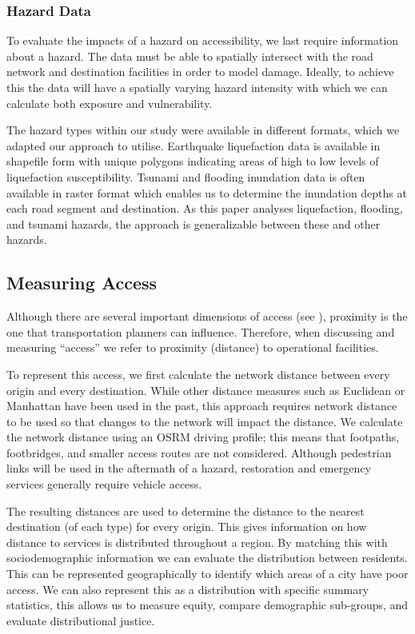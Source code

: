 \documentclass[review,3p,times,onecolumn,sort&compress,12pt]{elsarticle}
\begin{document}
\subsubsection{Hazard Data}
To evaluate the impacts of a hazard on accessibility, we last require information about a hazard. 
The data must be able to spatially intersect with the road network and destination facilities in order to model damage.
Ideally, to achieve this the data will have a spatially varying hazard intensity with which we can calculate both exposure and vulnerability.

The hazard types within our study were available in different formats, which we adapted our approach to utilise.
Earthquake liquefaction data is available in shapefile form with unique polygons indicating areas of high to low levels of liquefaction susceptibility. 
Tsunami and flooding inundation data is often available in raster format which enables us to determine the inundation depths at each road segment and destination.
As this paper analyses liquefaction, flooding, and tsunami hazards, the approach is generalizable between these and other hazards.

\subsection{Measuring Access}
Although there are several important dimensions of access (see \textcite{Penchansky1981-qh, Saurman2016-gj}), proximity is the one that transportation planners can influence. 
Therefore, when discussing and measuring ``access'' we refer to proximity (distance) to operational facilities. 

To represent this access, we first calculate the network distance between every origin and every destination.
While other distance measures such as Euclidean or Manhattan have been used in the past, this approach requires network distance to be used so that changes to the network will impact the distance.
We calculate the network distance using an OSRM driving profile; this means that footpaths, footbridges, and smaller access routes are not considered.
Although pedestrian links will be used in the aftermath of a hazard, restoration and emergency services generally require vehicle access.

The resulting distances are used to determine the distance to the nearest destination (of each type) for every origin.
This gives information on how distance to services is distributed throughout a region.
By matching this with sociodemographic information we can evaluate the distribution between residents. 
This can be represented geographically to identify which areas of a city have poor access.
We can also represent this as a distribution with specific summary statistics, this allows us to measure equity, compare demographic sub-groups, and evaluate distributional justice.
\end{document}
